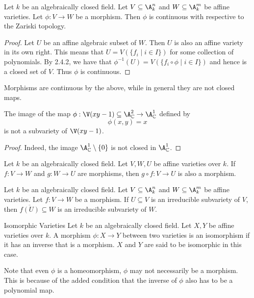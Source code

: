 \documentclass[a4paper]{article}
\begin{document}
\begin{prp}{}{} Let $k$ be an algebraically closed field. Let $V\subseteq\A_k^n$ and $W\subseteq\A_k^m$ be affine varieties. Let $\phi:V\to W$ be a morphism. Then $\phi$ is continuous with respective to the Zariski topology. 
\begin{proof}
Let $U$ be an affine algebraic subset of $W$. Then $U$ is also an affine variety in its own right. This means that $U=V(\{f_i\;|\;i\in I\})$ for some collection of polynomials. By 2.4.2, we have that $\phi^{-1}(U)=V(\{f_i\circ\phi\;|\;i\in I\})$ and hence is a closed set of $V$. Thus $\phi$ is continuous. 
\end{proof}
\end{prp}

Morphisms are continuous by the above, while in general they are not closed maps. 

\begin{eg}{}{} The image of the map $\phi:\V(xy-1)\subseteq\A_\C^2\to\A_\C^1$ defined by $$\phi(x,y)=x$$ is not a subvariety of $\V(xy-1)$. 
\begin{proof}
Indeed, the image $\A_\C^1\setminus\{0\}$ is not closed in $\A_\C^1$.
\end{proof}
\end{eg}

\begin{prp}{}{} Let $k$ be an algebraically closed field. Let $V,W,U$ be affine varieties over $k$. If $f:V\to W$ and $g:W\to U$ are morphisms, then $g\circ f:V\to U$ is also a morphism. 
\end{prp}

\begin{lmm}{}{} Let $k$ be an algebraically closed field. Let $V\subseteq\A_k^n$ and $W\subseteq\A_k^m$ be affine varieties. Let $f:V\to W$ be a morphism. If $U\subseteq V$ is an irreducible subvariety of $V$, then $\overline{f(U)}\subseteq W$ is an irreducible subvariety of $W$. 
\end{lmm}

\begin{defn}{Isomorphic Varieties}{} Let $k$ be an algebraically closed field. Let $X,Y$ be affine varieties over $k$. A morphism $\phi:X\to Y$ between two varieties is an isomorphism if it has an inverse that is a morphism. $X$ and $Y$ are said to be isomorphic in this case. 
\end{defn}

Note that even $\phi$ is a homeomorphism, $\phi$ may not necessarily be a morphism. This is because of the added condition that the inverse of $\phi$ also has to be a polynomial map. 
\end{document}
